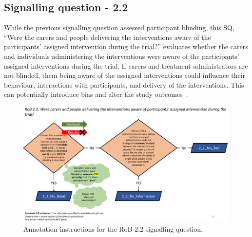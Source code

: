 \documentclass[sn-mathphys,Numbered]{sn-jnl}%
\begin{document}
\subsection*{Signalling question - 2.2}
\label{subsec:2_2}
%
While the previous signalling question assessed participant blinding, this SQ, ``Were the carers and people delivering the interventions aware of the participants' assigned intervention during the trial?'' evaluates whether the carers and individuals administering the interventions were aware of the participants' assigned interventions during the trial.
If carers and treatment administrators are not blinded, them being aware of the assigned interventions could influence their behaviour, interactions with participants, and delivery of the interventions.
This can potentially introduce bias and alter the study outcomes~\cite{hrobjartsson2011blinding}.


%
%
%
\begin{figure}[hbt]
    \centering
    \includegraphics[width=\textwidth]{figures/2_2.pdf}
    \caption{Annotation instructions for the RoB 2.2 signalling question.}
    \label{fig:2_2}
\end{figure}
%
%
%
\end{document}
